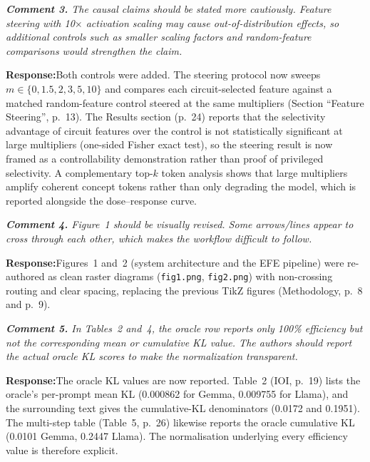 \documentclass[11pt]{article}
\newenvironment{comment}{%
  \def\FrameCommand{{\color{commentrule}\vrule width 3pt}\hspace{0pt}%
    \fboxsep=8pt\colorbox{commentbg}}%
  \MakeFramed{\advance\hsize-\width\FrameRestore}%
  \itshape\small}{\endMakeFramed}
\newcommand{\reviewerpoint}[1]{\medskip\noindent\textbf{Comment #1.}\;}
\newcommand{\response}{\par\smallskip\noindent\textbf{Response:}\;}
\begin{document}
\begin{comment}
\reviewerpoint{3} The causal claims should be stated more cautiously. Feature
steering with 10$\times$ activation scaling may cause out-of-distribution
effects, so additional controls such as smaller scaling factors and
random-feature comparisons would strengthen the claim.
\end{comment}
\response Both controls were added. The steering protocol now sweeps
$m\in\{0,1.5,2,3,5,10\}$ and compares each circuit-selected feature against a
matched random-feature control steered at the same multipliers
(Section ``Feature Steering'', p.~13). The Results section (p.~24) reports that
the selectivity advantage of circuit features over the control is not
statistically significant at large multipliers (one-sided Fisher exact test), so
the steering result is now framed as a controllability demonstration rather than
proof of privileged selectivity. A complementary top-$k$ token analysis shows
that large multipliers amplify coherent concept tokens rather than only
degrading the model, which is reported alongside the dose--response curve.

\begin{comment}
\reviewerpoint{4} Figure~1 should be visually revised. Some arrows/lines appear
to cross through each other, which makes the workflow difficult to follow.
\end{comment}
\response Figures~1 and~2 (system architecture and the EFE pipeline) were
re-authored as clean raster diagrams (\texttt{fig1.png}, \texttt{fig2.png}) with
non-crossing routing and clear spacing, replacing the previous TikZ figures
(Methodology, p.~8 and p.~9).

\begin{comment}
\reviewerpoint{5} In Tables~2 and~4, the oracle row reports only 100\% efficiency
but not the corresponding mean or cumulative KL value. The authors should report
the actual oracle KL scores to make the normalization transparent.
\end{comment}
\response The oracle KL values are now reported. Table~2 (IOI, p.~19) lists the
oracle's per-prompt mean KL (0.000862 for Gemma, 0.009755 for Llama), and the
surrounding text gives the cumulative-KL denominators (0.0172 and 0.1951). The
multi-step table (Table~5, p.~26) likewise reports the oracle cumulative KL (0.0101 Gemma,
0.2447 Llama). The normalisation underlying every efficiency value is therefore
explicit.
\end{document}
